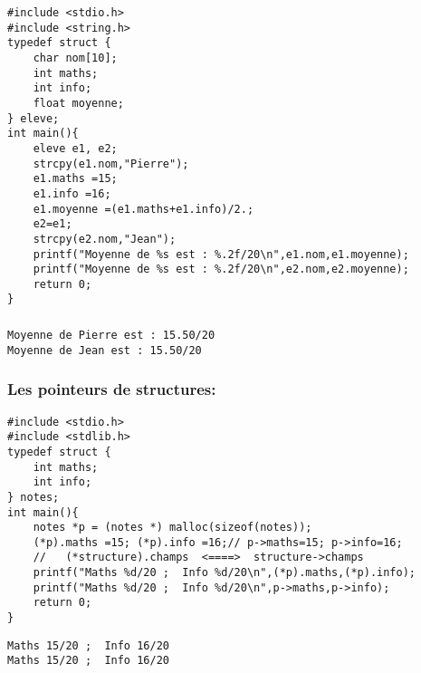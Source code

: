 \documentclass{beamer}
\begin{document}
 
\begin{frame}[fragile]
\begin{verbatim}  
#include <stdio.h>
#include <string.h>
typedef struct {
    char nom[10];
    int maths;
    int info;
    float moyenne;
} eleve;
int main(){
    eleve e1, e2;
    strcpy(e1.nom,"Pierre");
    e1.maths =15;
    e1.info =16;
    e1.moyenne =(e1.maths+e1.info)/2.;
    e2=e1;
    strcpy(e2.nom,"Jean");
    printf("Moyenne de %s est : %.2f/20\n",e1.nom,e1.moyenne);
    printf("Moyenne de %s est : %.2f/20\n",e2.nom,e2.moyenne);
    return 0;
}
\end{verbatim}

\end{frame}
  


 
\begin{frame}[fragile]
\frametitle{}

\begin{verbatim}
Moyenne de Pierre est : 15.50/20
Moyenne de Jean est : 15.50/20
\end{verbatim}

\end{frame}
 

\begin{frame}[fragile]
\frametitle{Les pointeurs de structures:}
\begin{verbatim}
#include <stdio.h>
#include <stdlib.h>
typedef struct {
    int maths;
    int info;
} notes;
int main(){
    notes *p = (notes *) malloc(sizeof(notes));
    (*p).maths =15; (*p).info =16;// p->maths=15; p->info=16;
    //   (*structure).champs  <====>  structure->champs
    printf("Maths %d/20 ;  Info %d/20\n",(*p).maths,(*p).info);
    printf("Maths %d/20 ;  Info %d/20\n",p->maths,p->info);
    return 0;
}
\end{verbatim}
\begin{verbatim}
Maths 15/20 ;  Info 16/20
Maths 15/20 ;  Info 16/20
\end{verbatim}
\end{frame}
  
\end{document}
